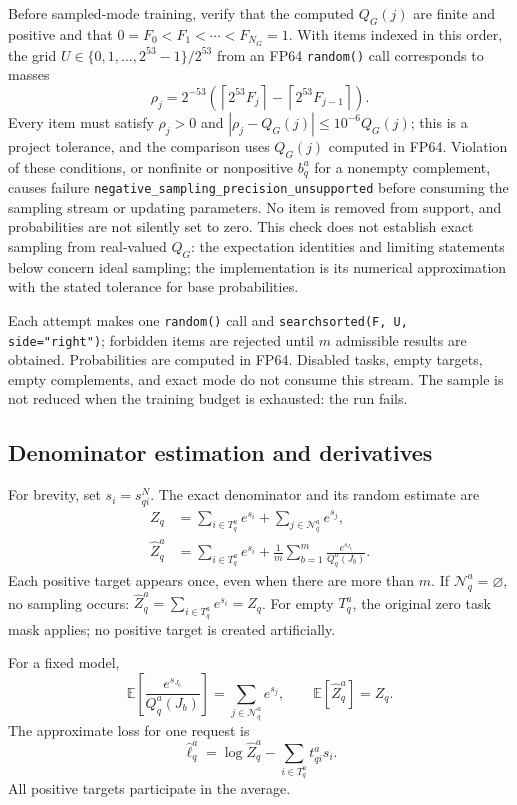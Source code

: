 \documentclass[12pt,a4paper]{article}
\newcommand{\code}[1]{{\ttfamily\small\nolinkurl{#1}}}
\newcommand{\E}{\mathbb E}
\theoremstyle{plainru}
\begin{document}
Before sampled-mode training, verify that the computed
$Q_G(j)$ are finite and positive and that $0=F_0<F_1<\cdots<F_{N_G}=1$.
With items indexed in this order, the grid
$U\in\{0,1,\ldots,2^{53}-1\}/2^{53}$ from an FP64 \code{random()}
call corresponds to masses
\[
\rho_j=2^{-53}\left(\left\lceil2^{53}F_j\right\rceil
-\left\lceil2^{53}F_{j-1}\right\rceil\right).
\]
Every item must satisfy $\rho_j>0$ and
$|\rho_j-Q_G(j)|\le10^{-6}Q_G(j)$; this is a project tolerance,
and the comparison uses $Q_G(j)$ computed in FP64.
Violation of these conditions, or nonfinite or nonpositive $b_q^a$
for a nonempty complement, causes failure
\code{negative_sampling_precision_unsupported} before consuming the sampling
stream or updating parameters. No item is removed from support,
and probabilities are not silently set to zero. This check does not establish exact sampling
from real-valued $Q_G$: the expectation identities and limiting statements
below concern ideal sampling; the implementation is its numerical
approximation with the stated tolerance for base probabilities.

Each attempt makes one \code{random()} call and
\code{searchsorted(F, U, side="right")};
forbidden items are rejected until $m$ admissible results are obtained.
Probabilities are computed in FP64. Disabled tasks, empty targets,
empty complements, and exact mode do not consume this stream.
The sample is not reduced when the training budget is exhausted: the run fails.

\subsection{Denominator estimation and derivatives}
\label{sec:sampled-loss}

For brevity, set $s_i=s_{qi}^{N}$.
The exact denominator and its random estimate are
\begin{align}\label{eq:sampled-normalizer}
Z_q&=\sum_{i\in T_q^a}e^{s_i}
       +\sum_{j\in\mathcal N_q^a}e^{s_j},\\
\widehat Z_q^a&=\sum_{i\in T_q^a}e^{s_i}
       +\frac1m\sum_{b=1}^{m}
        \frac{e^{s_{J_b}}}{Q_q^a(J_b)}.
\nonumber
\end{align}
Each positive target appears once, even when there are more than $m$.
If $\mathcal N_q^a=\varnothing$, no sampling occurs:
$\widehat Z_q^a=\sum_{i\in T_q^a}e^{s_i}=Z_q$.
For empty $T_q^a$, the original zero task mask applies;
no positive target is created artificially.

For a fixed model,
\begin{equation}\label{eq:sampled-unbiased-normalizer}
\E\!\left[\frac{e^{s_{J_b}}}{Q_q^a(J_b)}\right]
=\sum_{j\in\mathcal N_q^a}e^{s_j},
\qquad
\E[\widehat Z_q^a]=Z_q.
\end{equation}
The approximate loss for one request is
\begin{equation}\label{eq:sampled-query-loss}
\widehat\ell_q^a
=\log\widehat Z_q^a-\sum_{i\in T_q^a}t_{qi}^a s_i.
\end{equation}
All positive targets participate in the average.
\end{document}

